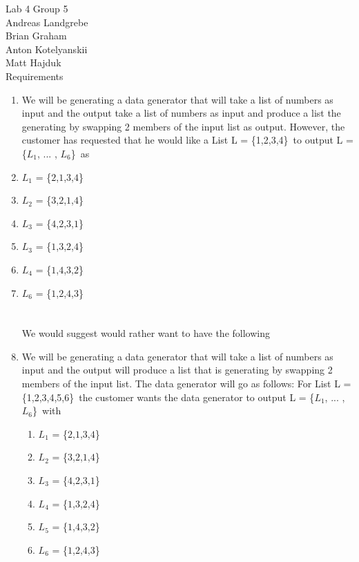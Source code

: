 \documentclass{article}
\begin{document}
Lab 4
Group 5
\\
Andreas Landgrebe
\\
Brian Graham
\\
Anton Kotelyanskii
\\
Matt Hajduk
\\
Requirements
\begin{enumerate}
\item We will be generating a data generator that will take a list of numbers as input and the output take a list of numbers as input and produce a list the generating by swapping 2 members of the input list as output. However, the customer has requested that he would like a List L = \{1,2,3,4\}\ to output L = \{$L_1$, ... , $L_6$\}\ as
\item $L_1$ = \{$2$,$1$,$3$,$4$\}\
\item $L_2$ = \{$3$,$2$,$1$,$4$\}\
\item $L_3$ = \{$4$,$2$,$3$,$1$\}\
\item $L_3$ = \{$1$,$3$,$2$,$4$\}\
\item $L_4$ = \{$1$,$4$,$3$,$2$\}\
\item $L_6$ = \{$1$,$2$,$4$,$3$\}\
\\
\\
\\

We would suggest would rather want to have the following
\\
\item We will be generating a data generator that will take a list of numbers as input and the output will produce a list that is generating by swapping 2 members of the input list. The data generator will go as follows:
For List L = \{1,2,3,4,5,6\}\ the customer wants the data generator to output L = \{$L_1$, ... ,$L_6$\}\ with
\begin{enumerate}
\item $L_1$ = \{$2$,$1$,$3$,$4$\}\
\item $L_2$ = \{$3$,$2$,$1$,$4$\}\
\item $L_3$ = \{$4$,$2$,$3$,$1$\}\
\item $L_4$ = \{$1$,$3$,$2$,$4$\}\
\item $L_5$ = \{$1$,$4$,$3$,$2$\}\
\item $L_6$ = \{$1$,$2$,$4$,$3$\}\
\end{enumerate} 
\end{enumerate}
\end{document}
